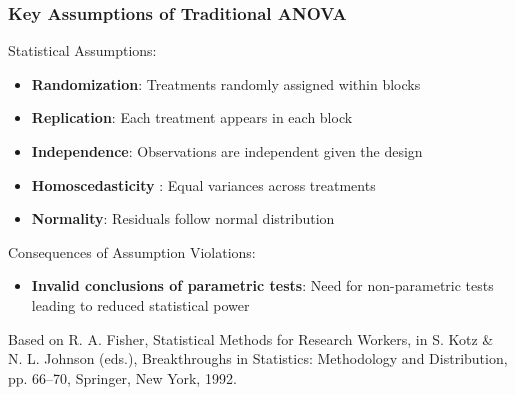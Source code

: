 \documentclass[aspectratio=43]{beamer}
\begin{document}
\begin{frame}
    \frametitle{Key Assumptions of Traditional ANOVA}
    
    \begin{block}{Statistical Assumptions:}
        \begin{itemize}
            \item \textbf{Randomization}: Treatments randomly assigned within blocks
            \item \textbf{Replication}: Each treatment appears in each block
            \item \textbf{Independence}: Observations are independent given the design
            \item \textbf{Homoscedasticity }: Equal variances across treatments
            \item \textbf{Normality}: Residuals follow normal distribution
        \end{itemize}
    \end{block}

    \begin{alertblock}{Consequences of Assumption Violations:}
        \begin{itemize}
            \item \textbf{Invalid conclusions of parametric tests}: Need for non-parametric tests leading to reduced statistical power
        \end{itemize}
    \end{alertblock}
    
    \vfill
    {\tiny
    \begin{flushleft}
        Based on R. A. Fisher, Statistical Methods for Research Workers, in S. Kotz \& N. L. Johnson (eds.), Breakthroughs in Statistics: Methodology and Distribution, pp. 66--70, Springer, New York, 1992.
    \end{flushleft}
    }
\end{frame}
\end{document}
